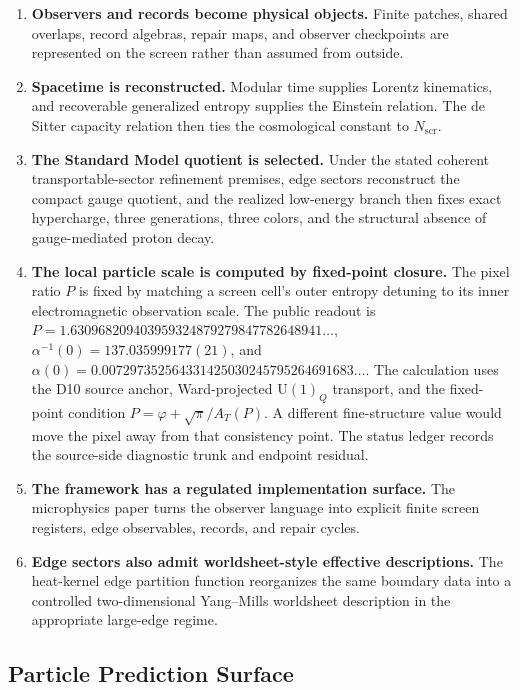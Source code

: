 \documentclass[11pt]{article}
\newcommand{\U}{\mathrm{U}}
\begin{document}
\begin{enumerate}[leftmargin=2em]
\item \textbf{Observers and records become physical objects.} Finite patches, shared overlaps,
record algebras, repair maps, and observer checkpoints are represented on the screen rather than
assumed from outside.
\item \textbf{Spacetime is reconstructed.} Modular time supplies Lorentz kinematics, and
recoverable generalized entropy supplies the Einstein relation. The de Sitter capacity relation
then ties the cosmological constant to \(N_{\mathrm{scr}}\).
\item \textbf{The Standard Model quotient is selected.} Under the stated coherent transportable-sector
refinement premises, edge sectors reconstruct the compact gauge quotient, and the realized low-energy branch
then fixes exact hypercharge, three generations, three colors, and the structural absence of
gauge-mediated proton decay.
\item \textbf{The local particle scale is computed by fixed-point closure.} The pixel ratio \(P\) is
fixed by matching a screen cell's outer entropy detuning to its inner electromagnetic observation
scale. The public readout is \(P=1.630968209403959324879279847782648941\ldots\),
\(\alpha^{-1}(0)=137.035999177(21)\), and
\(\alpha(0)=0.007297352564331425030245795264691683\ldots\). The calculation
uses the D10 source anchor, Ward-projected \(\U(1)_Q\) transport, and the
fixed-point condition \(P=\varphi+\sqrt{\pi}/A_T(P)\). A different
fine-structure value would move the pixel away from that consistency point.
The status ledger
records the source-side diagnostic trunk and endpoint residual.
\item \textbf{The framework has a regulated implementation surface.} The microphysics paper turns
the observer language into explicit finite screen registers, edge observables, records, and repair
cycles.
\item \textbf{Edge sectors also admit worldsheet-style effective descriptions.} The heat-kernel
edge partition function reorganizes the same boundary data into a controlled two-dimensional
Yang--Mills worldsheet description in the appropriate large-edge regime.
\end{enumerate}

\subsection*{Particle Prediction Surface}
\end{document}
